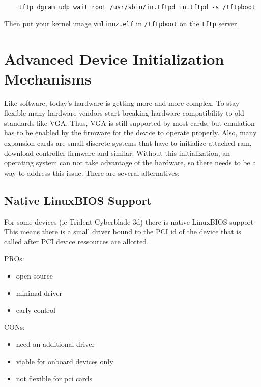 \documentclass[titlepage,12pt]{article}
\begin{document}
\begin{verbatim}
    tftp dgram udp wait root /usr/sbin/in.tftpd in.tftpd -s /tftpboot
\end{verbatim}

Then put your kernel image \texttt{vmlinuz.elf} in \texttt{/tftpboot} on
the \texttt{tftp} server.


\newpage

%
%

\section{Advanced Device Initialization Mechanisms}

Like software, today's hardware is getting more and more complex. To
stay flexible many hardware vendors start breaking hardware
compatibility to old standards like VGA. Thus, VGA is still supported by
most cards, but emulation has to be enabled by the firmware for the
device to operate properly.  Also, many expansion cards are small
discrete systems that have to initialize attached ram, download
controller firmware and similar. Without this initialization, an
operating system can not take advantage of the hardware, so there needs
to be a way to address this issue. There are several alternatives:

\subsection{Native LinuxBIOS Support}

For some devices (ie Trident Cyberblade 3d) there is native LinuxBIOS
support This means there is a small driver bound to the PCI id of the
device that is called after PCI device ressources are allotted.

PROs:
 \begin{itemize}
 \item open source
 \item minimal driver
 \item early control
 \end{itemize}

CONs:
 \begin{itemize}
 \item need an additional driver
 \item viable for onboard devices only
 \item not flexible for pci cards
 \end{itemize}
\end{document}
